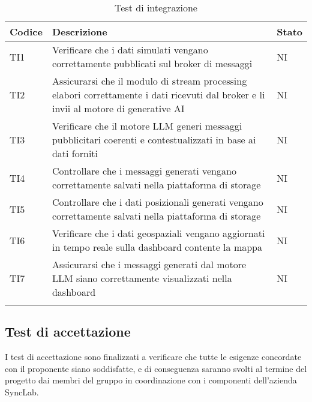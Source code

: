 \documentclass[10pt]{article}
\begin{document}
\begin{justify}
\begin{longtable}{|>{\centering\arraybackslash}m{2cm}|>{\centering\arraybackslash}m{7cm}|>{\centering\arraybackslash}m{2cm}|}
\hline
\textbf{Codice} & \textbf{Descrizione} & \textbf{Stato}\\
\endhead
\hline
TI1 & Verificare che i dati simulati vengano correttamente pubblicati sul broker di messaggi & NI\\
\hline
TI2 & Assicurarsi che il modulo di stream processing elabori correttamente i dati ricevuti dal broker e li invii al motore di generative AI & NI\\
\hline
TI3 & Verificare che il motore LLM generi messaggi pubblicitari coerenti e contestualizzati in base ai dati forniti & NI\\
\hline
TI4 & Controllare che i messaggi generati vengano correttamente salvati nella piattaforma di storage & NI\\
\hline
TI5 & Controllare che i dati posizionali generati vengano correttamente salvati nella piattaforma di storage & NI\\
\hline
TI6 & Verificare che i dati geospaziali vengano aggiornati in tempo reale sulla dashboard contente la mappa & NI\\
\hline
TI7 & Assicurarsi che i messaggi generati dal motore LLM siano correttamente visualizzati nella dashboard & NI\\
\hline
\caption{Test di integrazione}\\
\end{longtable}

\subsection{Test di accettazione}
I test di accettazione sono finalizzati a verificare che tutte le esigenze concordate con il proponente siano soddisfatte, e di conseguenza saranno
svolti al termine del progetto dai membri del gruppo in coordinazione con i componenti dell'azienda SyncLab.\\


\end{justify}
\end{document}
